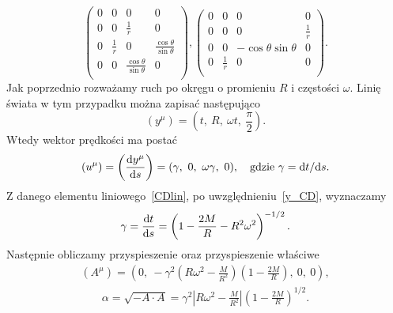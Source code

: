 $$
\left(
\begin{array}{cccc}
 0 & 0 & 0 & 0 \\
 0 & 0 & \frac{1}{r} & 0 \\
 0 & \frac{1}{r} & 0 & \frac{\cos \theta}{\sin\theta}  \\
 0 & 0 &\frac{ \cos \theta }{\sin \theta }  & 0 \\
\end{array}
\right),\left(
\begin{array}{cccc}
 0 & 0 & 0 & 0 \\
 0 & 0 & 0 & \frac{1}{r} \\
 0 & 0 & -\cos \theta\sin \theta  & 0 \\
 0 & \frac{1}{r} & 0 & 0 \\
\end{array}
\right) .
$$
Jak poprzednio rozważamy ruch po okręgu o promieniu $R$ i częstości $\omega$.
Linię świata w tym przypadku można zapisać następująco
\begin{equation}\label{y_CD}
(y^\mu) = \left( t,\ R,\ \omega t,\ \frac{\pi}{2}\right).
\end{equation}
Wtedy wektor prędkości ma postać
\begin{equation}\nonumber
(u^\mu) = \left( \frac{\text{d} y^\mu}{\text{d} s} \right) 
= (\gamma,\ 0,\ \omega\gamma,\ 0),
\quad \text{gdzie } \gamma = \text{d} t/\text{d} s. 
\end{equation}
Z danego elementu liniowego~\eqref{CDlin}, 
po uwzględnieniu~\eqref{y_CD}, wyznaczamy
\begin{align}\nonumber
\gamma = \frac{\text{d} t}{\text{d} s} = 
 \left(1 - \frac{2 M}{R} - R^2\omega^2 \right)^{-1/2}.
\end{align}
Następnie obliczamy przyspieszenie oraz przyspieszenie właściwe
\begin{align}\nonumber
(A^\mu) = \left(0,\ -\gamma^2 \left( R\omega^2 - \frac{M}{R^2} \right) 
\left(1-\frac{2M}{R}\right),\ 0,\ 0 \right) ,
\end{align}
\begin{align}\nonumber
\alpha = \sqrt{-A\cdot A} = \gamma^2 
\left| R\omega^2 - \frac{M}{R^2} \right|
\left( 1-\frac{2M}{R} \right)^{1/2} .
\end{align}


